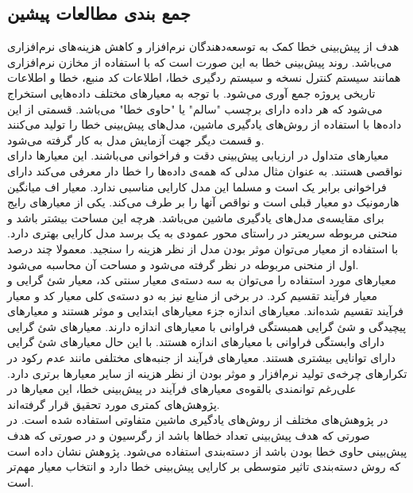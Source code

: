 \subsection{جمع بندی مطالعات پیشین}
هدف از پیش‌بینی خطا کمک به توسعه‌دهندگان نرم‌افزار و کاهش هزینه‌های نرم‌افزاری می‌باشد. روند پیش‌بینی خطا به این صورت است که با استفاده از مخازن نرم‌افزاری همانند سیستم کنترل نسخه و سیستم ردگیری خطا، اطلاعات کد منبع، خطا و اطلاعات تاریخی پروژه جمع آوری می‌شود. با توجه به معیارهای مختلف داده‌هایی استخراج می‌شود که هر داده دارای برچسب "سالم" یا "حاوی خطا" می‌باشد. قسمتی از این داده‌ها با استفاده از روش‌های یادگیری ماشین، مدل‌های پیش‌بینی خطا را تولید می‌کنند و قسمت دیگر جهت آزمایش مدل به کار گرفته می‌شود.\\

معیارهای متداول در ارزیابی پیش‌بینی دقت و فراخوانی می‌باشند. این معیارها دارای نواقصی هستند. به عنوان مثال مدلی که همه‌ی داده‌ها را خطا دار معرفی می‌کند دارای فراخوانی  برابر یک است و مسلما این مدل کارایی مناسبی ندارد. معیار اف  میانگین هارمونیک دو معیار قبلی است و نواقص آنها را بر طرف می‌کند. یکی از معیار‌های رایج برای مقایسه‌ی مدل‌های یادگیری ماشین  می‌باشد. هرچه این مساحت بیشتر باشد و منحنی مربوطه سریعتر  در راستای محور عمودی  به یک برسد مدل کارایی بهتری دارد. با استفاده از معیار  می‌توان موثر بودن مدل از نظر هزینه را سنجید. معمولا چند درصد اول از منحنی مربوطه در نظر گرفته می‌شود و مساحت آن محاسبه می‌شود. \\

معیارهای مورد استفاده را می‌توان به سه دسته‌ی معیار سنتی کد، معیار شئ گرایی و معیار فرآیند تقسیم کرد. در برخی از منابع نیز  به دو دسته‌ی کلی معیار کد و معیار فرآیند تقسیم شده‌اند. معیارهای اندازه جزء معیارهای ابتدایی و موثر هستند و معیارهای پیچیدگی و شئ گرایی همبستگی فراوانی با معیارهای اندازه دارند. معیارهای شئ گرایی دارای وابستگی فراوانی با معیار‌های اندازه هستند. با این حال معیارهای شئ گرایی دارای توانایی بیشتری هستند. معیارهای فرآیند از جنبه‌های مختلفی  مانند عدم رکود در تکرار‌های چرخه‌ی تولید نرم‌افزار و موثر بودن از نظر هزینه از سایر معیارها برتری دارد. علی‌رغم توانمندی بالقوه‌ی معیارهای فرآیند در پیش‌بینی خطا، این معیارها در پژوهش‌های کمتری مورد تحقیق قرار گرفته‌اند. \\

در پژوهش‌های مختلف از روش‌های یادگیری ماشین متفاوتی استفاده شده است. در صورتی که هدف پیش‌بینی تعداد خطاها باشد از رگرسیون و در صورتی که هدف پیش‌بینی حاوی خطا بودن باشد از دسته‌بندی استفاده می‌شود. پژوهش \cite{arisholm2010systematic}  نشان داده است که روش دسته‌بندی تاثیر متوسطی بر کارایی پیش‌بینی خطا دارد و انتخاب معیار مهم‌تر است. \\

